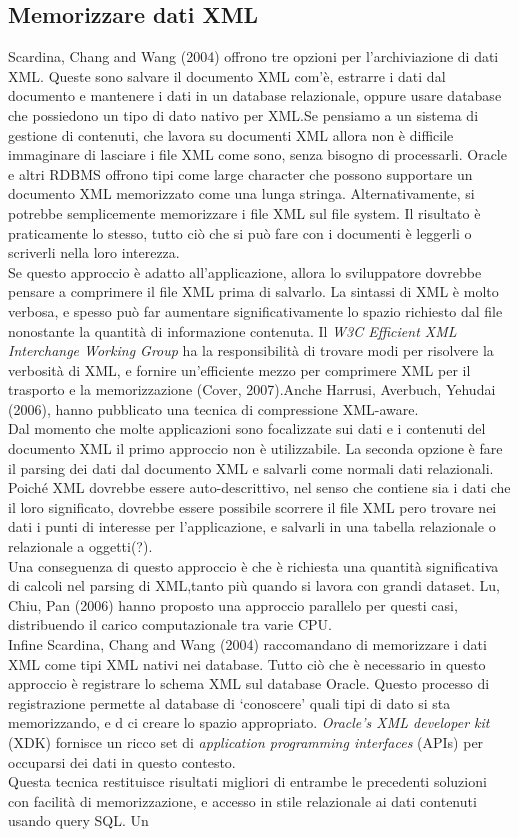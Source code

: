\documentclass[12pt,a4paper,openright,twoside]{report}
\theoremstyle{definition}
\begin{document}
\subsection{Memorizzare dati XML}
Scardina, Chang and Wang (2004) offrono tre opzioni per l'archiviazione di dati XML. Queste sono salvare il documento XML com'è, estrarre i dati dal documento e mantenere i dati in un database relazionale, oppure usare database che possiedono un tipo di dato nativo per XML.Se pensiamo a un sistema di gestione di contenuti, che lavora su documenti XML allora non è difficile immaginare di lasciare i file XML come sono, senza bisogno di processarli. Oracle e altri RDBMS offrono tipi come large character che possono supportare un documento XML memorizzato come una lunga stringa. Alternativamente, si potrebbe semplicemente memorizzare i file XML sul file system. Il risultato è praticamente lo stesso, tutto ciò che si può fare con i documenti è leggerli o scriverli nella loro interezza.\\Se questo approccio è adatto all'applicazione, allora lo sviluppatore dovrebbe pensare a comprimere il file XML prima di salvarlo. La sintassi di XML è molto verbosa, e spesso può far aumentare significativamente lo spazio richiesto dal file nonostante la quantità di informazione contenuta. Il \emph{W3C Efficient XML Interchange Working Group} ha la responsibilità di trovare modi per risolvere la verbosità di XML, e fornire un'efficiente mezzo per comprimere XML per il trasporto e la memorizzazione (Cover, 2007).Anche  Harrusi, Averbuch, Yehudai (2006), hanno pubblicato una tecnica di compressione XML-aware.\\Dal momento che molte applicazioni sono focalizzate sui dati e i contenuti del documento XML il primo approccio non è utilizzabile. La seconda opzione è fare il parsing dei dati dal documento XML e salvarli come normali dati relazionali. Poiché XML dovrebbe essere auto-descrittivo, nel senso che contiene sia i dati che il loro significato, dovrebbe essere possibile scorrere il file XML pero trovare nei dati i punti di interesse per l'applicazione, e salvarli in una tabella relazionale o relazionale a oggetti(?).\\Una conseguenza di questo approccio è che è richiesta una quantità significativa di calcoli nel parsing di XML,tanto più quando si lavora con grandi dataset. Lu, Chiu, Pan (2006) hanno proposto una approccio parallelo per questi casi, distribuendo il carico computazionale tra varie CPU.\\Infine Scardina, Chang and Wang (2004) raccomandano di memorizzare i dati XML come tipi XML nativi nei database. Tutto ciò che è necessario in questo approccio è registrare lo schema XML sul database Oracle. Questo processo di registrazione permette al database di ‘conoscere’ quali tipi di dato si sta memorizzando, e d ci creare lo spazio appropriato. \emph{Oracle’s XML developer kit} (XDK) fornisce un ricco set di \emph{application programming interfaces} (APIs) per occuparsi dei dati in questo contesto.\\Questa tecnica restituisce risultati migliori di entrambe le precedenti soluzioni con facilità di memorizzazione, e accesso in stile relazionale ai dati contenuti usando query SQL. Un 
\end{document}
